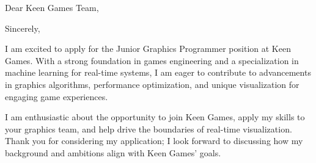 \documentclass[12pt,a4paper]{moderncv}
\makeatletter
\newcommand*{\subject}[1]{\def\@subject{#1}}
\makeatother
\begin{document}
\date{Würzburg, \today}%
\subject{Application for Junior Graphics Programmer}
\opening{Dear Keen Games Team,}
    
\closing{Sincerely,}

\makelettertitle
I am excited to apply for the Junior Graphics Programmer position at Keen Games. 
With a strong foundation in games engineering and a specialization in machine learning 
for real-time systems, I am eager to contribute to advancements in graphics algorithms, 
performance optimization, and unique visualization for engaging game experiences.

 

 



I am enthusiastic about the opportunity to join Keen Games, 
apply my skills to your graphics team, and help drive the boundaries of real-time visualization. 
Thank you for considering my application; 
I look forward to discussing how my background and ambitions align with Keen Games’ goals.

\vspace{0.5cm}


\makeletterclosing
\end{document}
